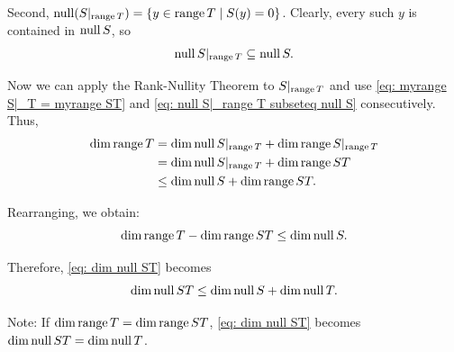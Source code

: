 \begin{xrcs}
\begin{xprf}
    Second, $\operatorname{null} (S|_{\operatorname{range} T}) = \{ y \in \operatorname{range} T \mid S(y) = 0 \}$. Clearly, every such $y$ is contained in $\operatorname{null} S$, so
    \begin{equation}
      \label{eq: null S|_range T subseteq null S}
      \operatorname{null} S|_{\operatorname{range} T} \subseteq \operatorname{null} S.
    \end{equation}

    Now we can apply the Rank-Nullity Theorem to $S|_{\operatorname{range} T}$ and use \eqref{eq: myrange S|_T = myrange ST} and \eqref{eq: null S|_range T subseteq null S} consecutively. Thus,
    \begin{equation}
      \begin{aligned}
        \dim \operatorname{range} T & =    \dim \operatorname{null} S|_{\operatorname{range} T} + \dim \operatorname{range} S|_{\operatorname{range} T} \\
                        & =    \dim \operatorname{null} S|_{\operatorname{range} T} + \dim \operatorname{range} ST \\
                        & \leq \dim \operatorname{null} S + \dim \operatorname{range} ST.
      \end{aligned}
    \end{equation}

    Rearranging, we obtain:
    \begin{equation}
      \dim \operatorname{range} T - \dim \operatorname{range} ST \leq \dim \operatorname{null} S.
    \end{equation}

    Therefore, \eqref{eq: dim null ST} becomes
    \begin{equation}
      \dim \operatorname{null} ST \leq \dim \operatorname{null} S + \dim \operatorname{null} T.
    \end{equation}

    Note: If $\dim \operatorname{range} T = \dim \operatorname{range} ST$, \eqref{eq: dim null ST} becomes $\dim \operatorname{null} ST = \dim \operatorname{null} T$.
  \end{xprf}
\end{xrcs}

